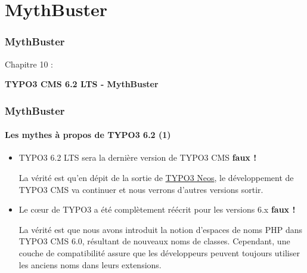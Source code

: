 %

\section{MythBuster}
\begin{frame}[fragile]
	\frametitle{MythBuster}

	\begin{center}\huge{Chapitre 10 :}\end{center}
	\begin{center}\huge{\color{typo3darkgrey}\textbf{TYPO3 CMS 6.2 LTS - MythBuster}}\end{center}

\end{frame}


\begin{frame}[fragile]
	\frametitle{MythBuster}
	\framesubtitle{Les mythes à propos de TYPO3 6.2 (1)}

	\begin{itemize}
		\item TYPO3 6.2 LTS sera la dernière version de TYPO3 CMS
			\tabto{9cm}\color{red}\textbf{\textrightarrow faux !}\color{black}

			\smaller
				La vérité est qu'en dépit de la sortie de \href{http://neos.typo3.org}{TYPO3 Neos}, le développement de TYPO3 CMS va continuer et nous verrons d'autres versions sortir.
			\normalsize

		\item Le cœur de TYPO3 a été complètement réécrit pour les versions 6.x
			\tabto{9cm}\color{red}\textbf{\textrightarrow faux !}\color{black}
			
			\smaller
				La vérité est que nous avons introduit la notion d'espaces de noms PHP dans TYPO3 CMS 6.0, résultant de nouveaux noms de classes. Cependant, une couche de compatibilité assure que les développeurs peuvent toujours utiliser les anciens noms dans leurs extensions.
			\normalsize

	\end{itemize}

\end{frame}

